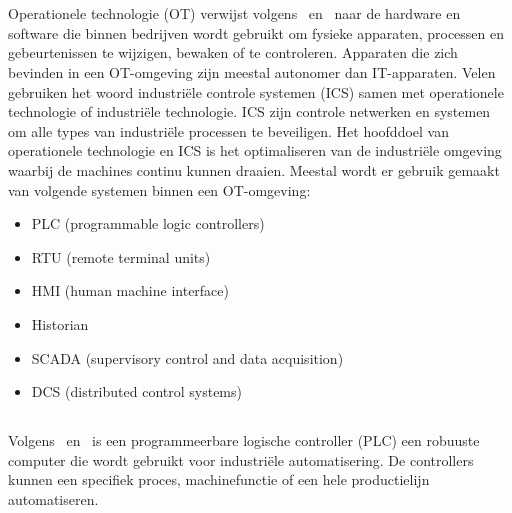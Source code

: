\section{}
\label{sec:operationele technologie}
\subsection{}
\label{subsec:operationele technologie}
Operationele technologie (OT) verwijst volgens~\textcite{VirtualArmour2020} en~\textcite{Gartner} naar de hardware en software die binnen bedrijven wordt gebruikt om fysieke apparaten, processen en gebeurtenissen te wijzigen, bewaken of te controleren. Apparaten die zich bevinden in een OT-omgeving zijn meestal autonomer dan IT-apparaten. Velen gebruiken het woord industriële controle systemen (ICS) samen met operationele technologie of industriële technologie. ICS zijn controle netwerken en systemen om alle types van industriële processen te beveiligen. Het hoofddoel van operationele technologie en ICS is het optimaliseren van de industriële omgeving waarbij de machines continu kunnen draaien. Meestal wordt er gebruik gemaakt van volgende systemen binnen een OT-omgeving:
\begin{itemize}
    \item PLC (programmable logic controllers)
    \item RTU (remote terminal units)
    \item HMI (human machine interface)
    \item Historian
    \item SCADA (supervisory control and data acquisition)
    \item DCS (distributed control systems)
    
    
\end{itemize}
\subsection{}
\label{subsec:OTcomponenten}
\subsubsection{}
\label{subsubsec:PLC}
Volgens~\textcite{Unitronics} en~\textcite{2020} is een programmeerbare logische controller (PLC) een robuuste computer die wordt gebruikt voor industriële automatisering. De controllers kunnen een specifiek proces, machinefunctie of een hele productielijn automatiseren.

